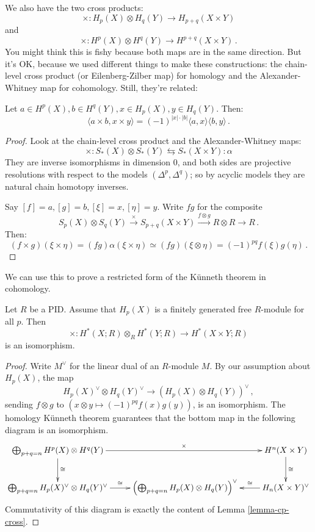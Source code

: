 We also have the two cross products:
\[
\times: H_p(X)\otimes H_q(Y)\to H_{p+q}(X\times Y)
\]
and
\[\times: H^p(X)\otimes H^q(Y)\to H^{p+q}(X\times Y)\,.
\]
You might think this is fishy because both maps are in the same direction.
But it's OK, because we used different things to make these constructions:
the chain-level cross product (or Eilenberg-Zilber map) 
for homology and the Alexander-Whitney map for
cohomology. Still, they're related:
\begin{lemma}
\label{lemma-cp-cross}
Let $a\in H^p(X),b\in H^q(Y),x\in H_p(X), y\in H_q(Y)$. Then:
\begin{equation*}
\langle a\times b,x\times y\rangle=(-1)^{|x|\cdot |b|}\langle a,x\rangle\langle b,y\rangle\,.
\end{equation*}
\end{lemma}
\begin{proof}
Look at the chain-level cross product and the Alexander-Whitney maps:
\[
\times:S_*(X)\otimes S_*(Y)\leftrightarrows S_*(X\times Y):\alpha
\]
They are inverse isomorphisms in dimension 0, 
and both sides are projective resolutions with respect to the models
$(\Delta^p,\Delta^q)$; so by acyclic models they are natural chain 
homotopy inverses. 

Say $[f]=a,[g]=b,[\xi]=x,[\eta]=y$. Write 
$fg$ for the composite 
\[
S_p(X)\otimes S_q(Y)\xrightarrow{\times}S_{p+q}(X\times Y)
\xrightarrow{f\otimes g}R\otimes R\to R\,.
\]
Then:
\[
(f\times g)(\xi\times\eta)=(fg)\alpha(\xi\times\eta)\simeq(fg)(\xi\otimes\eta) 
=(-1)^{pq}f(\xi)g(\eta)\,.
\]
\end{proof}

We can use this to prove a restricted form of the K\"unneth theorem in 
cohomology.
\begin{theorem}
\label{thm-coh-kunneth}
Let $R$ be a PID. Assume that $H_p(X)$ is a finitely generated free $R$-module
for all $p$. Then 
\[
\times:H^\ast(X;R)\otimes_RH^\ast(Y;R)\to H^\ast(X\times Y;R)
\]
is an isomorphism. 
\end{theorem}
\begin{proof}
Write $M^\vee$ for the linear dual of an $R$-module $M$. 
By our assumption about $H_p(X)$, the map
\[
H_p(X)^\vee\otimes H_q(Y)^\vee\to\left(H_p(X)\otimes H_q(Y)\right)^\vee\,,
\]
sending $f\otimes g$ to $(x\otimes y\mapsto(-1)^{pq}f(x)g(y))$,
is an isomorphism. The homology K\"unneth theorem guarantees that the 
bottom map in the following diagram is an isomorphism.
\[
\xymatrix{
\bigoplus_{p+q=n}H^p(X)\otimes H^q(Y) \ar[rr]^-\times\ar[d]^\cong && 
H^n(X\times Y) \ar[d]^-\cong \\
\bigoplus_{p+q=n}H_p(X)^\vee\otimes H_q(Y)^\vee \ar[r]^-\cong &
\left(\bigoplus_{p+q=n}H_p(X)\otimes H_q(Y)\right)^\vee &
H_n(X\times Y)^\vee \ar[l]_-\cong
}\]
Commutativity of this diagram is exactly the content of 
Lemma \ref{lemma-cp-cross}. 
\end{proof}

